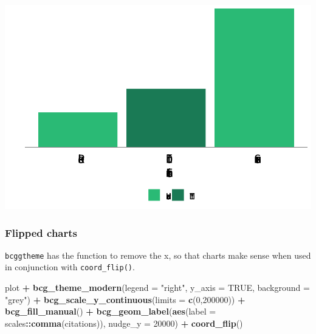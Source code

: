 \documentclass[
]{article}
\newenvironment{Shaded}{\begin{snugshade}}{\end{snugshade}}
\newcommand{\DataTypeTok}[1]{\textcolor[rgb]{0.13,0.29,0.53}{#1}}
\newcommand{\DecValTok}[1]{\textcolor[rgb]{0.00,0.00,0.81}{#1}}
\newcommand{\KeywordTok}[1]{\textcolor[rgb]{0.13,0.29,0.53}{\textbf{#1}}}
\newcommand{\NormalTok}[1]{#1}
\newcommand{\OperatorTok}[1]{\textcolor[rgb]{0.81,0.36,0.00}{\textbf{#1}}}
\newcommand{\OtherTok}[1]{\textcolor[rgb]{0.56,0.35,0.01}{#1}}
\newcommand{\StringTok}[1]{\textcolor[rgb]{0.31,0.60,0.02}{#1}}
\begin{document}
\includegraphics{using_bcggtheme_files/figure-latex/unnamed-chunk-9-1.pdf}

\hypertarget{flipped-charts}{%
\subsubsection{Flipped charts}\label{flipped-charts}}

\texttt{bcggtheme} has the function to remove the x, so that charts make
sense when used in conjunction with \texttt{coord\_flip()}.

\begin{Shaded}
\begin{Highlighting}[]
\NormalTok{plot }\OperatorTok{+}
\StringTok{  }\KeywordTok{bcg_theme_modern}\NormalTok{(}\DataTypeTok{legend =} \StringTok{"right"}\NormalTok{, }\DataTypeTok{y_axis =} \OtherTok{TRUE}\NormalTok{, }\DataTypeTok{background =} \StringTok{"grey"}\NormalTok{) }\OperatorTok{+}
\StringTok{  }\KeywordTok{bcg_scale_y_continuous}\NormalTok{(}\DataTypeTok{limits =} \KeywordTok{c}\NormalTok{(}\DecValTok{0}\NormalTok{,}\DecValTok{200000}\NormalTok{)) }\OperatorTok{+}
\StringTok{  }\KeywordTok{bcg_fill_manual}\NormalTok{() }\OperatorTok{+}
\StringTok{  }\KeywordTok{bcg_geom_label}\NormalTok{(}\KeywordTok{aes}\NormalTok{(}\DataTypeTok{label =}\NormalTok{ scales}\OperatorTok{::}\KeywordTok{comma}\NormalTok{(citations)), }\DataTypeTok{nudge_y =} \DecValTok{20000}\NormalTok{) }\OperatorTok{+}
\StringTok{  }\KeywordTok{coord_flip}\NormalTok{()}
\end{Highlighting}
\end{Shaded}
\end{document}
